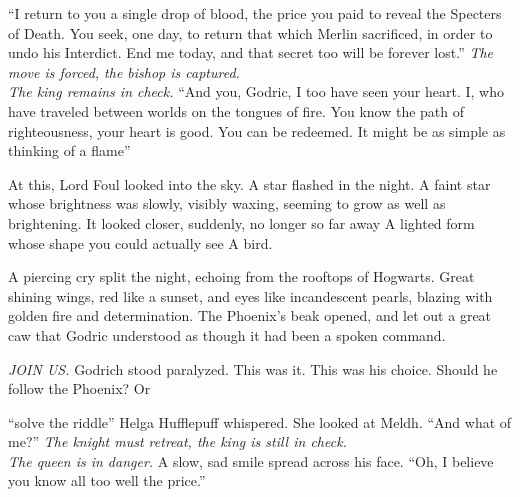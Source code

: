 “I return to you a single drop of blood, the price you paid to reveal the Specters of Death. You seek, one day, to return that which Merlin sacrificed, in order to undo his Interdict. End me today, and that secret too will be forever lost.”
\SmallVSpace
\emph{The move is forced, the bishop is captured.\\\indent The king remains in check.}
\SmallVSpace
“And you, Godric, I too have seen your heart. I, who have traveled between worlds on the tongues of fire. You know the path of righteousness, your heart is good. You can be redeemed. It might be as simple as thinking of a flame{\el}”

At this, Lord Foul looked into the sky. A star flashed in the night. A faint star whose brightness was slowly, visibly waxing, seeming to grow as well as brightening. It looked closer, suddenly, no longer so far away{\el} A lighted form whose shape you could actually see{\el}
\SmallVSpace
A bird.

A piercing cry split the night, echoing from the rooftops of Hogwarts. Great shining wings, red like a sunset, and eyes like incandescent pearls, blazing with golden fire and determination. The Phoenix’s beak opened, and let out a great caw that Godric understood as though it had been a spoken command.

\emph{JOIN US.}
\SmallVSpace
Godrich stood paralyzed. This was it. This was his choice. Should he follow the Phoenix? Or{\el}

“{\el}solve the riddle{\el}” Helga Hufflepuff whispered. She looked at Meldh. “And what of me?”
\SmallVSpace
\emph{The knight must retreat, the king is still in check.\\\indent The queen is in danger.}
\SmallVSpace
A slow, sad smile spread across his face. “Oh, I believe you know all too well the price.”

